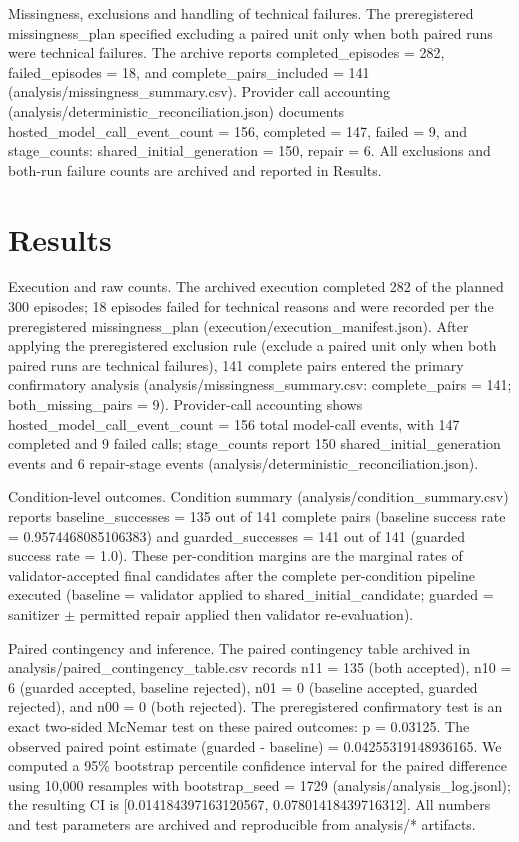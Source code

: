 \documentclass[conference]{IEEEtran}
\begin{document}
Missingness, exclusions and handling of technical failures. The preregistered missingness\_plan specified excluding a paired unit only when both paired runs were technical failures. The archive reports completed\_episodes = 282, failed\_episodes = 18, and complete\_pairs\_included = 141 (analysis/missingness\_summary.csv). Provider call accounting (analysis/deterministic\_reconciliation.json) documents hosted\_model\_call\_event\_count = 156, completed = 147, failed = 9, and stage\_counts: shared\_initial\_generation = 150, repair = 6. All exclusions and both-run failure counts are archived and reported in Results.

\section{Results}
Execution and raw counts. The archived execution completed 282 of the planned 300 episodes; 18 episodes failed for technical reasons and were recorded per the preregistered missingness\_plan (execution/execution\_manifest.json). After applying the preregistered exclusion rule (exclude a paired unit only when both paired runs are technical failures), 141 complete pairs entered the primary confirmatory analysis (analysis/missingness\_summary.csv: complete\_pairs = 141; both\_missing\_pairs = 9). Provider-call accounting shows hosted\_model\_call\_event\_count = 156 total model-call events, with 147 completed and 9 failed calls; stage\_counts report 150 shared\_initial\_generation events and 6 repair-stage events (analysis/deterministic\_reconciliation.json).

Condition-level outcomes. Condition summary (analysis/condition\_summary.csv) reports baseline\_successes = 135 out of 141 complete pairs (baseline success rate = 0.9574468085106383) and guarded\_successes = 141 out of 141 (guarded success rate = 1.0). These per-condition margins are the marginal rates of validator-accepted final candidates after the complete per-condition pipeline executed (baseline = validator applied to shared\_initial\_candidate; guarded = sanitizer \ensuremath{\pm} permitted repair applied then validator re-evaluation).

Paired contingency and inference. The paired contingency table archived in analysis/paired\_contingency\_table.csv records n11 = 135 (both accepted), n10 = 6 (guarded accepted, baseline rejected), n01 = 0 (baseline accepted, guarded rejected), and n00 = 0 (both rejected). The preregistered confirmatory test is an exact two-sided McNemar test on these paired outcomes: p = 0.03125. The observed paired point estimate (guarded - baseline) = 0.04255319148936165. We computed a 95\% bootstrap percentile confidence interval for the paired difference using 10,000 resamples with bootstrap\_seed = 1729 (analysis/analysis\_log.jsonl); the resulting CI is [0.014184397163120567, 0.07801418439716312]. All numbers and test parameters are archived and reproducible from analysis/* artifacts.
\end{document}
